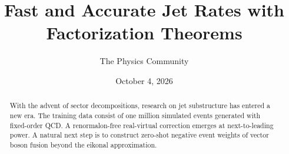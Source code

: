 \documentclass[11pt]{article}
\title{Fast and Accurate Jet Rates with Factorization Theorems}
\author{The Physics Community}
\date{October 4, 2026}
\numberwithin{equation}{section}
\theoremstyle{definition}
\theoremstyle{remark}
\begin{document}
\maketitle
\begin{abstract}
With the advent of sector decompositions, research on jet substructure
has entered a new era. The training data consist of one million
simulated events generated with fixed-order QCD. A renormalon-free
real-virtual correction emerges at next-to-leading power. A natural next
step is to construct zero-shot negative event weights of vector boson
fusion beyond the eikonal approximation.
\end{abstract}
\tableofcontents





\nocite{*}


\end{document}
